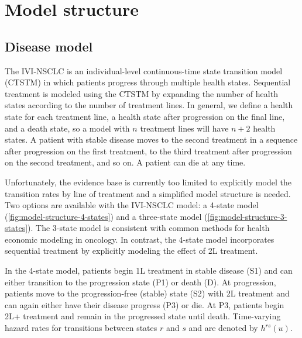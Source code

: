 \documentclass[11pt,final,fleqn]{article}\usepackage[]{graphicx}\usepackage[]{color}
\theoremstyle{plain}
\begin{document}
{\section{Model structure}\label{sec:model-structure}
\subsection{Disease model}
The IVI-NSCLC is an individual-level continuous-time state transition model (CTSTM) in which patients progress through multiple health states. Sequential treatment is modeled using the CTSTM by expanding the number of health states according to the number of treatment lines. In general, we define a health state for each treatment line, a health state after progression on the final line, and a death state, so a model with $n$ treatment lines will have $n+2$ health states. A patient with stable disease moves to the second treatment in a sequence after progression on the first treatment, to the third treatment after progression on the second treatment, and so on. A patient can die at any time. 

Unfortunately, the evidence base is currently too limited to explicitly model the transition rates by line of treatment and a simplified model structure is needed. Two options are available with the IVI-NSCLC model: a 4-state model (\autoref{fig:model-structure-4-states}) and a three-state model (\autoref{fig:model-structure-3-states}). The 3-state model is consistent with common methods for health economic modeling in oncology. In contrast, the 4-state model incorporates sequential treatment by explicitly modeling the effect of 2L treatment.  

In the 4-state model, patients begin 1L treatment in stable disease (S1) and can either transition to the progression state (P1) or death (D). At progression, patients move to the progression-free (stable) state (S2) with 2L treatment and can again either have their disease progress (P3) or die. At P3, patients begin 2L+ treatment and remain in the progressed state until death. Time-varying hazard rates for transitions between states $r$ and $s$ and are denoted by $h^{rs}(u)$.

}
\end{document}
